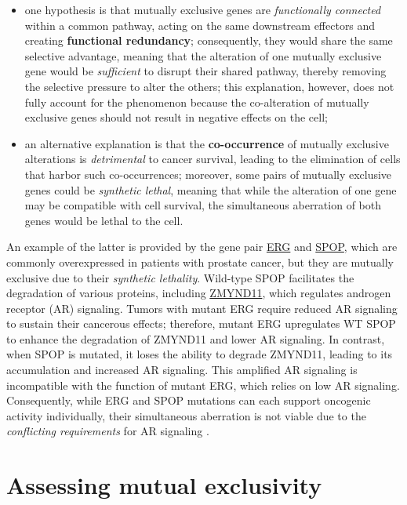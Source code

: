 \begin{itemize}
    \item one hypothesis is that mutually exclusive genes are \textit{functionally connected} within a common pathway, acting on the same downstream effectors and creating \textbf{functional redundancy}; consequently, they would share the same selective advantage, meaning that the alteration of one mutually exclusive gene would be \textit{sufficient} to disrupt their shared pathway, thereby removing the selective pressure to alter the others; this explanation, however, does not fully account for the phenomenon because the co-alteration of mutually exclusive genes should not result in negative effects on the cell;
    \item an alternative explanation is that the \textbf{co-occurrence} of mutually exclusive alterations is \textit{detrimental} to cancer survival, leading to the elimination of cells that harbor such co-occurrences; moreover, some pairs of mutually exclusive genes could be \textit{synthetic lethal}, meaning that while the alteration of one gene may be compatible with cell survival, the simultaneous aberration of both genes would be lethal to the cell.
\end{itemize}

An example of the latter is provided by the gene pair \href{https://www.ncbi.nlm.nih.gov/gene/2078}{ERG} and \href{https://www.ncbi.nlm.nih.gov/gene/8405}{SPOP}, which are commonly overexpressed in patients with prostate cancer, but they are mutually exclusive due to their \textit{synthetic lethality}. Wild-type SPOP facilitates the degradation of various proteins, including \href{https://www.ncbi.nlm.nih.gov/gene/10771}{ZMYND11}, which regulates androgen receptor (AR) signaling. Tumors with mutant ERG require reduced AR signaling to sustain their cancerous effects; therefore, mutant ERG upregulates WT SPOP to enhance the degradation of ZMYND11 and lower AR signaling. In contrast, when SPOP is mutated, it loses the ability to degrade ZMYND11, leading to its accumulation and increased AR signaling. This amplified AR signaling is incompatible with the function of mutant ERG, which relies on low AR signaling. Consequently, while ERG and SPOP mutations can each support oncogenic activity individually, their simultaneous aberration is not viable due to the \textit{conflicting requirements} for AR signaling \cite{erg_spop}.

\section{Assessing mutual exclusivity}

